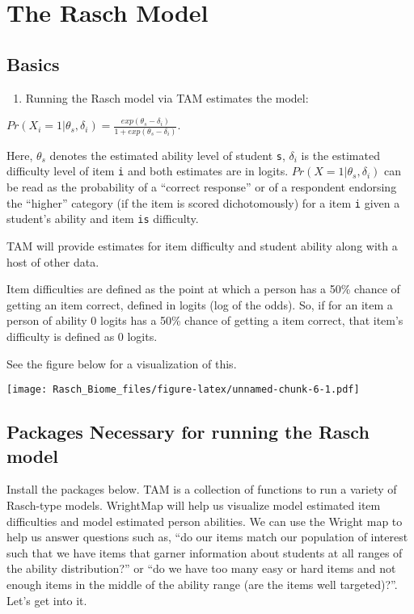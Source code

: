 \documentclass[
]{book}
\providecommand{\tightlist}{%
  \setlength{\itemsep}{0pt}\setlength{\parskip}{0pt}}
\begin{document}
\hypertarget{Rasch}{%
\chapter{The Rasch Model}\label{Rasch}}

\hypertarget{basics}{%
\section{Basics}\label{basics}}

\begin{enumerate}
\def\labelenumi{\arabic{enumi}.}
\tightlist
\item
  Running the Rasch model via TAM estimates the model:
\end{enumerate}

\(Pr(X_i=1|\theta_s, \delta_i) = \frac{exp(\theta_s-\delta_i)}{1+exp(\theta_s-\delta_i)}\).

Here, \(\theta_s\) denotes the estimated ability level of student \texttt{s}, \(\delta_i\) is the estimated difficulty level of item \texttt{i} and both estimates are in logits. \(Pr(X=1|\theta_s, \delta_i)\) can be read as the probability of a ``correct response'' or of a respondent endorsing the ``higher'' category (if the item is scored dichotomously) for a item \texttt{i} given a student's ability and item \texttt{i\textquotesingle{}s} difficulty.

TAM will provide estimates for item difficulty and student ability along with a host of other data.

Item difficulties are defined as the point at which a person has a 50\% chance of getting an item correct, defined in logits (log of the odds). So, if for an item a person of ability 0 logits has a 50\% chance of getting a item correct, that item's difficulty is defined as 0 logits.

See the figure below for a visualization of this.

\texttt{[image: Rasch\_Biome\_files/figure-latex/unnamed-chunk-6-1.pdf]}

\hypertarget{packages-necessary-for-running-the-rasch-model}{%
\section{Packages Necessary for running the Rasch model}\label{packages-necessary-for-running-the-rasch-model}}

Install the packages below. TAM is a collection of functions to run a variety of Rasch-type models. WrightMap will help us visualize model estimated item difficulties and model estimated person abilities. We can use the Wright map to help us answer questions such as, ``do our items match our population of interest such that we have items that garner information about students at all ranges of the ability distribution?'' or ``do we have too many easy or hard items and not enough items in the middle of the ability range (are the items well targeted)?''.
Let's get into it.
\end{document}
